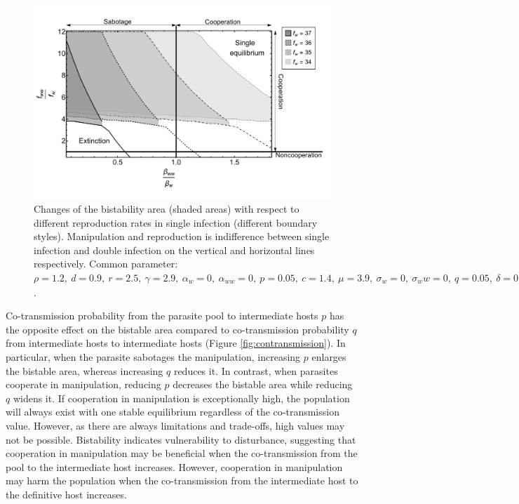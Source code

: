 \documentclass[a4paper]{scrartcl}
\begin{document}
\begin{figure}[!ht]
\centering
\includegraphics[width=\textwidth]{Figures/ratio_reproduction_manipulation.pdf}
\caption{Changes of the bistability area (shaded areas) with respect to different reproduction rates in single infection (different boundary styles). Manipulation and reproduction is indifference between single infection and double infection on the vertical and horizontal lines respectively. Common parameter:  $\rho = 1.2, \ d = 0.9, \ r = 2.5, \ \gamma = 2.9, \ \alpha_w = 0, \ \alpha_{ww} = 0, \ p = 0.05, \ c = 1.4, \ \mu = 3.9, \ \sigma_w = 0, \ \sigma_ww = 0, \ q = 0.05, \ \delta = 0.9, \ k = 0.26, \  \beta_w = 1.65, h_1 = h_2 = 0.6$.}
\label{fig:manipbifur}
\end{figure}

Co-transmission probability from the parasite pool to intermediate hosts $p$ has the opposite effect on the bistable area compared to co-transmission probability $q$ from intermediate hosts to intermediate hosts (Figure \ref{fig:contransmission}). 
In particular, when the parasite sabotages the manipulation, increasing $p$ enlarges the bistable area, whereas increasing $q$ reduces it. 
In contrast, when parasites cooperate in manipulation, reducing $p$ decreases the bistable area while reducing $q$ widens it.  
If cooperation in manipulation is exceptionally high, the population will always exist with one stable equilibrium regardless of the co-transmission value.
However, as there are always limitations and trade-offs, high values may not be possible.
Bistability indicates vulnerability to disturbance, suggesting that cooperation in manipulation may be beneficial when the co-transmission from the pool to the intermediate host increases. 
However, cooperation in manipulation may harm the population when the co-transmission from the intermediate host to the definitive host increases.
\end{document}
